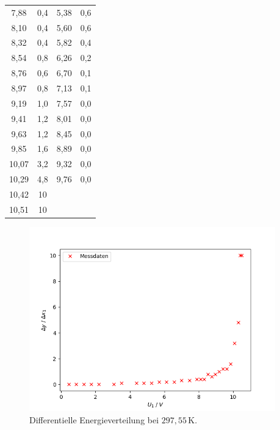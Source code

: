 \begin{table}[H]
\begin{tabular} {c  c  c  c}
        7,88 & 0,4  & 5,38 & 0,6 \\
        8,10 & 0,4  & 5,60 & 0,6 \\
        8,32 & 0,4  & 5,82 & 0,4 \\
        8,54 & 0,8  & 6,26 & 0,2 \\
        8,76 & 0,6  & 6,70 & 0,1 \\
        8,97 & 0,8  & 7,13 & 0,1 \\
        9,19 & 1,0  & 7,57 & 0,0 \\
        9,41 & 1,2  & 8,01 & 0,0 \\
        9,63 & 1,2  & 8,45 & 0,0 \\
        9,85 & 1,6  & 8,89 & 0,0 \\
        10,07 & 3,2 & 9,32 & 0,0 \\
        10,29 & 4,8 & 9,76 & 0,0 \\
        10,42 & 10  &      &     \\
        10,51 & 10  &      &     \\
        \bottomrule
    \end{tabular} 
\end{table}

\begin{figure}[H]
    \centering
    \includegraphics[height=80mm]{bilder/1.png}
    \caption{Differentielle Energieverteilung bei $297,55\,\unit{\kelvin}$.\label{Abbildung4} }
\end{figure}

